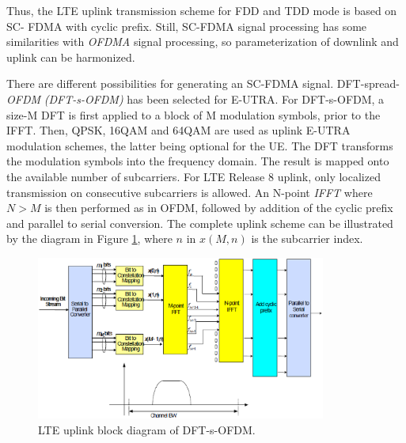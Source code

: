 Thus, the LTE uplink transmission scheme for FDD and TDD mode is based on SC-
FDMA with cyclic prefix. Still, SC-FDMA signal processing has some similarities
with \textit{OFDMA} signal processing, so parameterization of downlink and
uplink can be harmonized.

There are different possibilities for generating an SC-FDMA signal. DFT-spread-
\textit{OFDM} \textit{(DFT-s-OFDM)} has been selected for E-UTRA. For
DFT-s-OFDM, a size-M DFT is first applied to a block of M modulation symbols,
prior to the IFFT. Then, QPSK, 16QAM and 64QAM are used as uplink E-UTRA
modulation schemes, the latter being optional for the UE. The DFT transforms the
modulation symbols into the frequency domain. The result is mapped onto the
available number of subcarriers. For LTE Release 8 uplink, only localized
transmission on consecutive subcarriers is allowed. An N-point \textit{IFFT}
where $N>M$ is then performed as in OFDM, followed by addition of the cyclic
prefix and parallel to serial conversion. The complete uplink scheme can be
illustrated by the diagram in Figure \ref{fig:uplinkbd}, where $n$ in $x(M,n)$
is the subcarrier index.

\begin{figure}[htbp]
    \centering
    \includegraphics[width=0.85\textwidth]{./figures/uplink_scheme}
    \caption{ LTE uplink block diagram of DFT-s-OFDM.
    \label{fig:uplinkbd}}
\end{figure}
